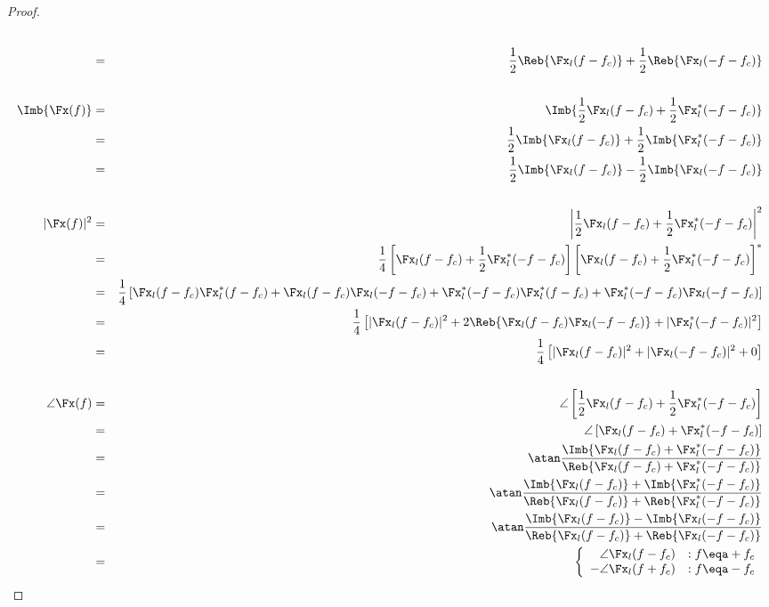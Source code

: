 \begin{proof}
\begin{eqnarray*}
   \\&=& \frac{1}{2}\Reb{\Fx_l(f-f_c)} + \frac{1}{2}\Reb{\Fx_l(-f-f_c)}
\\ \\
   \Imb{\Fx(f)}
     &=& \Imb{\frac{1}{2}\Fx_l(f-f_c) + \frac{1}{2}\Fx_l^\ast(-f-f_c)}
   \\&=& \frac{1}{2}\Imb{\Fx_l(f-f_c)} + \frac{1}{2}\Imb{\Fx_l^\ast(-f-f_c)}
   \\&=& \frac{1}{2}\Imb{\Fx_l(f-f_c)} - \frac{1}{2}\Imb{\Fx_l(-f-f_c)}
\\ \\
   |\Fx(f)|^2
     &=& \left| \frac{1}{2}\Fx_l(f-f_c) + \frac{1}{2}\Fx_l^\ast(-f-f_c) \right|^2
   \\&=& \frac{1}{4}
         \left[\Fx_l(f-f_c) + \frac{1}{2}\Fx_l^\ast(-f-f_c) \right]
         \left[\Fx_l(f-f_c) + \frac{1}{2}\Fx_l^\ast(-f-f_c) \right]^\ast
   \\&=& \frac{1}{4} \left[
         \Fx_l     ( f-f_c) \Fx_l^\ast( f-f_c) +
         \Fx_l     ( f-f_c) \Fx_l     (-f-f_c) +
         \Fx_l^\ast(-f-f_c) \Fx_l^\ast( f-f_c) +
         \Fx_l^\ast(-f-f_c) \Fx_l     (-f-f_c)
         \right]
   \\&=& \frac{1}{4} \left[
         |\Fx_l( f-f_c)|^2 +
         2\Reb{\Fx_l     ( f-f_c) \Fx_l     (-f-f_c)} +
         |\Fx_l^\ast(-f-f_c)|^2
         \right]
   \\&=& \frac{1}{4} \left[
         |\Fx_l( f-f_c)|^2 + |\Fx_l(-f-f_c)|^2 + 0
         \right]
\\ \\
   \angle\Fx(f)
     &=& \angle\left[ \frac{1}{2}\Fx_l(f-f_c) + \frac{1}{2}\Fx_l^\ast(-f-f_c) \right]
   \\&=& \angle\left[ \Fx_l(f-f_c) + \Fx_l^\ast(-f-f_c) \right]
   \\&=& \atan\frac{\Imb{\Fx_l(f-f_c) + \Fx_l^\ast(-f-f_c) }}
                   {\Reb{\Fx_l(f-f_c) + \Fx_l^\ast(-f-f_c) }}
   \\&=& \atan\frac{\Imb{\Fx_l(f-f_c)} + \Imb{\Fx_l^\ast(-f-f_c) }}
                   {\Reb{\Fx_l(f-f_c)} + \Reb{\Fx_l^\ast(-f-f_c) }}
   \\&=& \atan\frac{\Imb{\Fx_l(f-f_c)} - \Imb{\Fx_l(-f-f_c) }}
                   {\Reb{\Fx_l(f-f_c)} + \Reb{\Fx_l(-f-f_c) }}
   \\&=& \left\{\begin{array}{rl}
          \angle\Fx_l(f-f_c) &:f\eqa +f_c \\
         -\angle\Fx_l(f+f_c) &:f\eqa -f_c
         \end{array}\right.
\end{eqnarray*}
\end{proof}



